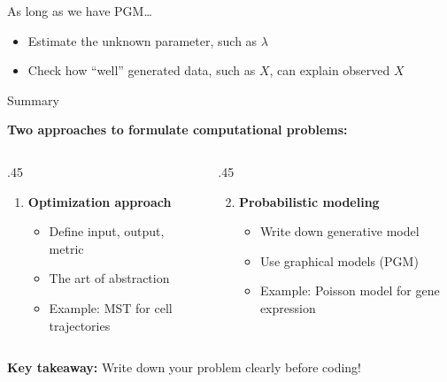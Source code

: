 \documentclass[
  12pt,
  ignorenonframetext,
  aspectratio=169]{beamer}
\providecommand{\tightlist}{%
  \setlength{\itemsep}{0pt}\setlength{\parskip}{0pt}}
\begin{document}
\begin{frame}{As long as we have PGM\ldots{}}
\protect{}\label{as-long-as-we-have-pgm}
\large

\begin{itemize}
\item
  Estimate the unknown parameter, such as \(\lambda\)
\item
  Check how ``well'' generated data, such as \(X\), can explain observed
  \(X\)
\end{itemize}
\end{frame}

\begin{frame}{Summary}
\protect{}\label{summary}
\large

\textbf{Two approaches to formulate computational problems:}

\normalsize

\begin{columns}[T]
\begin{column}{.45\linewidth}
\begin{enumerate}
\tightlist
\item
  \textbf{Optimization approach}

  \begin{itemize}
  \tightlist
  \item
    Define input, output, metric
  \item
    The art of abstraction
  \item
    Example: MST for cell trajectories
  \end{itemize}
\end{enumerate}
\end{column}

\begin{column}{.45\linewidth}
\begin{enumerate}
\setcounter{enumi}{1}
\tightlist
\item
  \textbf{Probabilistic modeling}

  \begin{itemize}
  \tightlist
  \item
    Write down generative model
  \item
    Use graphical models (PGM)
  \item
    Example: Poisson model for gene expression
  \end{itemize}
\end{enumerate}
\end{column}
\end{columns}

\vfill

\large

\textbf{Key takeaway:} Write down your problem clearly before coding!
\end{frame}
\end{document}
